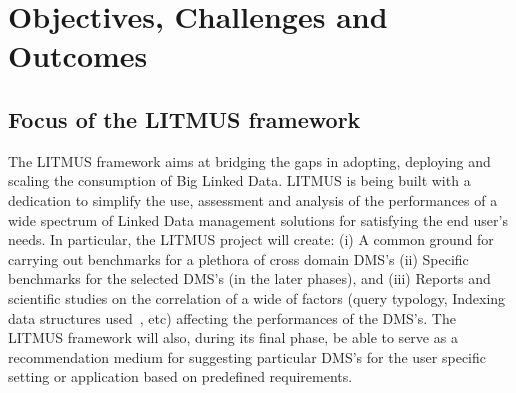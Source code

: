 \documentclass{llncs}
\begin{document}
\section{Objectives, Challenges and Outcomes}\label{Objectives}

    \subsection{Focus of the LITMUS framework}
    The LITMUS framework aims at bridging the gaps in adopting, deploying and scaling the consumption of Big Linked Data. LITMUS is being built with a dedication to simplify the use, assessment and analysis of the performances of a wide spectrum of Linked Data management solutions for satisfying the end user's needs.  In particular, the LITMUS project will create: (i) A common ground for carrying out benchmarks for a plethora of cross domain DMS's (ii) Specific benchmarks for the selected DMS's (in the later phases), and  (iii) Reports and scientific studies on the correlation of a wide of factors (query typology, Indexing data structures used~\cite{shekarpour2016question}, etc) affecting the performances of the DMS's. The LITMUS framework will also, during its final phase, be able to serve as a recommendation medium for suggesting particular DMS's for the user specific setting or application based on predefined requirements. 
    
\end{document}

